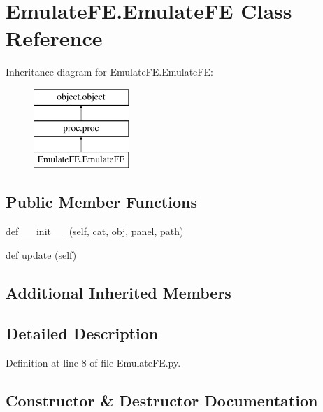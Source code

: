 \hypertarget{classEmulateFE_1_1EmulateFE}{}\section{Emulate\+F\+E.\+Emulate\+FE Class Reference}
\label{classEmulateFE_1_1EmulateFE}
Inheritance diagram for Emulate\+F\+E.\+Emulate\+FE\+:\begin{figure}[H]
\begin{center}
\leavevmode
\includegraphics[height=3.000000cm]{classEmulateFE_1_1EmulateFE}
\end{center}
\end{figure}
\subsection*{Public Member Functions}
\begin{DoxyCompactItemize}
\item 
def \hyperlink{classEmulateFE_1_1EmulateFE_aa9871941190d71b8fa8e4b70ee66f9e4}{\+\_\+\+\_\+init\+\_\+\+\_\+} (self, \hyperlink{classobject_1_1object_af114388a80cca208c152ffeca0e89e23}{cat}, \hyperlink{classobject_1_1object_a82b61e7cd7e18b1f9de10fc832e5b75e}{obj}, \hyperlink{classproc_1_1proc_a36068ce6d978f4f4dde164e7bdc2e057}{panel}, \hyperlink{classobject_1_1object_a2a518f960961d791b0f900a90c3cd287}{path})
\item 
def \hyperlink{classEmulateFE_1_1EmulateFE_aefc7339cfc727ad13e3307761ff72795}{update} (self)
\end{DoxyCompactItemize}
\subsection*{Additional Inherited Members}


\subsection{Detailed Description}


Definition at line 8 of file Emulate\+F\+E.\+py.



\subsection{Constructor \& Destructor Documentation}
\mbox{\label{classEmulateFE_1_1EmulateFE_aa9871941190d71b8fa8e4b70ee66f9e4}} 
